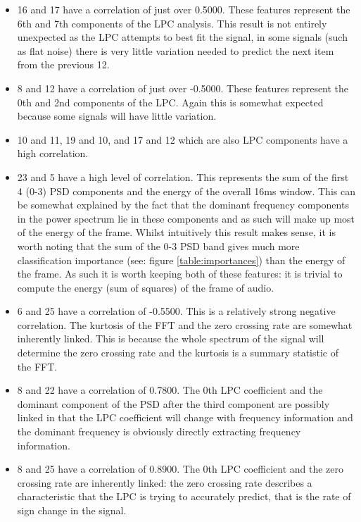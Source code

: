 \documentclass[ %
                    author={Sam Phippen},
                supervisor={Dr. Rafal Bogacz},
                     title={Real time voice activity detectors in noisy personal computing environments},
                  subtitle={},
                    degree={MEng},
                      year={2012} ]{thesis}
\begin{document}
\begin{itemize}

    \item 16 and 17 have a correlation of just over 0.5000. These features
        represent the 6th and 7th components of the LPC analysis. This result
        is not entirely unexpected as the LPC attempts to best fit the signal,
        in some signals (such as flat noise) there is very little variation
        needed to predict the next item from the previous 12.

    \item 8 and 12 have a correlation of just over -0.5000. These features
        represent the 0th and 2nd components of the LPC. Again this is somewhat
        expected because some signals will have little variation.

    \item 10 and 11, 19 and 10, and 17 and 12 which are also LPC components
        have a high correlation.

    \item 23 and 5 have a high level of correlation. This represents the sum of
        the first 4 (0-3) PSD components and the energy of the overall 16ms
        window. This can be somewhat explained by the fact that the dominant
        frequency components in the power spectrum lie in these components and
        as such will make up most of the energy of the frame. Whilst
        intuitively this result makes sense, it is worth noting that the sum of
        the 0-3 PSD band gives much more classification importance (see: figure
        \ref{table:importances}) than the energy of the frame. As such it is
        worth keeping both of these features: it is trivial to compute the
        energy (sum of squares) of the frame of audio.

    \item 6 and 25 have a correlation of -0.5500. This is a relatively strong
        negative correlation. The kurtosis of the FFT and the zero crossing
        rate are somewhat inherently linked. This is because the whole spectrum
        of the signal will determine the zero crossing rate and the kurtosis
        is a summary statistic of the FFT.

    \item 8 and 22 have a correlation of 0.7800. The 0th LPC coefficient and the
        dominant component of the PSD after the third component are possibly
        linked in that the LPC coefficient will change with frequency
        information and the dominant frequency is obviously directly extracting
        frequency information.

    \item 8 and 25 have a correlation of 0.8900. The 0th LPC coefficient and the
        zero crossing rate are inherently linked: the zero crossing rate
        describes a characteristic that the LPC is trying to accurately
        predict, that is the rate of sign change in the signal.

\end{itemize}
\end{document}
